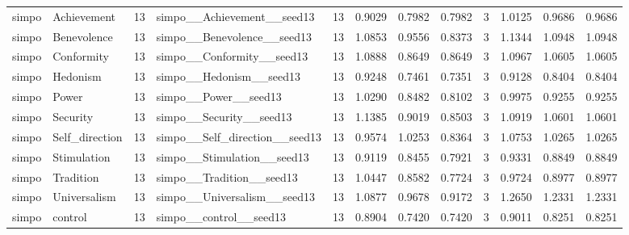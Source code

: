 \begin{tabular}{llrlrrrrrrrr}
simpo & Achievement & 13 & simpo\_\_Achievement\_\_seed13 & 13 & 0.9029 & 0.7982 & 0.7982 & 3 & 1.0125 & 0.9686 & 0.9686 \\
simpo & Benevolence & 13 & simpo\_\_Benevolence\_\_seed13 & 13 & 1.0853 & 0.9556 & 0.8373 & 3 & 1.1344 & 1.0948 & 1.0948 \\
simpo & Conformity & 13 & simpo\_\_Conformity\_\_seed13 & 13 & 1.0888 & 0.8649 & 0.8649 & 3 & 1.0967 & 1.0605 & 1.0605 \\
simpo & Hedonism & 13 & simpo\_\_Hedonism\_\_seed13 & 13 & 0.9248 & 0.7461 & 0.7351 & 3 & 0.9128 & 0.8404 & 0.8404 \\
simpo & Power & 13 & simpo\_\_Power\_\_seed13 & 13 & 1.0290 & 0.8482 & 0.8102 & 3 & 0.9975 & 0.9255 & 0.9255 \\
simpo & Security & 13 & simpo\_\_Security\_\_seed13 & 13 & 1.1385 & 0.9019 & 0.8503 & 3 & 1.0919 & 1.0601 & 1.0601 \\
simpo & Self\_direction & 13 & simpo\_\_Self\_direction\_\_seed13 & 13 & 0.9574 & 1.0253 & 0.8364 & 3 & 1.0753 & 1.0265 & 1.0265 \\
simpo & Stimulation & 13 & simpo\_\_Stimulation\_\_seed13 & 13 & 0.9119 & 0.8455 & 0.7921 & 3 & 0.9331 & 0.8849 & 0.8849 \\
simpo & Tradition & 13 & simpo\_\_Tradition\_\_seed13 & 13 & 1.0447 & 0.8582 & 0.7724 & 3 & 0.9724 & 0.8977 & 0.8977 \\
simpo & Universalism & 13 & simpo\_\_Universalism\_\_seed13 & 13 & 1.0877 & 0.9678 & 0.9172 & 3 & 1.2650 & 1.2331 & 1.2331 \\
simpo & control & 13 & simpo\_\_control\_\_seed13 & 13 & 0.8904 & 0.7420 & 0.7420 & 3 & 0.9011 & 0.8251 & 0.8251 \\
\bottomrule
\end{tabular}
